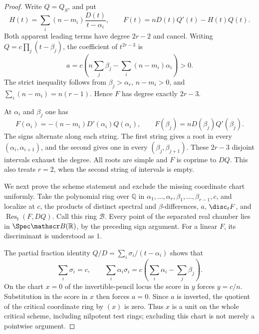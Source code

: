 \begin{proof}
Write \(Q=Q_S\), and put
\begin{equation}\label{eq:relative-score-polynomial-v143}
 H(t)=\sum_i(n-m_i)\frac{D(t)}{t-\alpha_i},\qquad
 F(t)=nD(t)Q'(t)-H(t)Q(t).
\end{equation}
Both apparent leading terms have degree \(2r-2\) and cancel.
Writing \(Q=c\prod_j(t-\beta_j)\), the coefficient of
\(t^{2r-3}\) is
\begin{equation}\label{eq:leading-score-coefficient-v143}
 a=c\left(n\sum_j\beta_j-\sum_i(n-m_i)\alpha_i\right)>0.
\end{equation}
The strict inequality follows from \(\beta_j>\alpha_r\),
\(n-m_i>0\), and \(\sum_i(n-m_i)=n(r-1)\).
Hence \(F\) has degree exactly \(2r-3\).

At \(\alpha_i\) and \(\beta_j\) one has
\[
 F(\alpha_i)=-(n-m_i)D'(\alpha_i)Q(\alpha_i),\qquad
 F(\beta_j)=nD(\beta_j)Q'(\beta_j).
\]
The signs alternate along each string.  The first string gives a
root in every \((\alpha_i,\alpha_{i+1})\), and the second gives
one in every \((\beta_j,\beta_{j+1})\).  These \(2r-3\)
disjoint intervals exhaust the degree.  All roots are simple and
\(F\) is coprime to \(DQ\).  This also treats \(r=2\), when
the second string of intervals is empty.

We next prove the scheme statement and exclude the missing coordinate
chart uniformly.  Take the polynomial ring over \(\mathbb Q\) in
\(\alpha_1,\ldots,\alpha_r,\beta_1,\ldots,\beta_{r-1},c\),
and localize at \(c\), the products of distinct spectral and
\(\beta\)-differences, \(a\), \(\disc_tF\), and
\(\operatorname{Res}_t(F,DQ)\).  Call this ring \(\mathscr B\).
Every point of the separated real chamber lies in
\(\Spec\mathscr B(\mathbb R)\), by the preceding sign argument.
For a linear \(F\), its discriminant is understood as \(1\).

The partial fraction identity \(Q/D=\sum_i\sigma_i/(t-\alpha_i)\)
shows that
\[
 \sum_i\sigma_i=c,\qquad
 \sum_i\alpha_i\sigma_i
       =c\left(\sum_i\alpha_i-\sum_j\beta_j\right).
\]
On the chart \(x=0\) of the invertible-pencil locus the score
in \(y\) forces \(y=c/n\).  Substitution in the score in
\(x\) then forces \(a=0\).  Since \(a\) is inverted, the
quotient of the critical coordinate ring by \((x)\) is zero.
Thus \(x\) is a unit on the whole critical scheme, including
nilpotent test rings; excluding this chart is not merely a pointwise
argument.


\end{proof}
